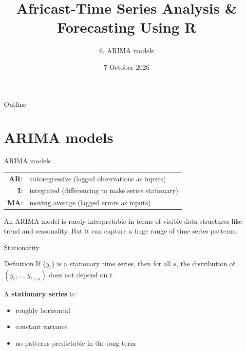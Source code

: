 \documentclass[
  14pt,
  ignorenonframetext,
  aspectratio=169,
]{beamer}
\title{\texorpdfstring{Africast-Time Series Analysis \& Forecasting
Using R}{Africast-Time Series Analysis \& Forecasting Using R}}
\subtitle{\texorpdfstring{6. ARIMA models}{6. ARIMA models}}
\author{}
\date{7 October 2026}
\providecommand{\tightlist}{%
  \setlength{\itemsep}{0pt}\setlength{\parskip}{0pt}}
\begin{document}
\frame{\titlepage}


\begin{frame}{Outline}
\protect{}\label{outline}
\vspace*{0.7cm}\tableofcontents
\end{frame}

\section{ARIMA models}\label{arima-models}

\begin{frame}{ARIMA models}
\protect{}\label{arima-models-1}
\begin{tabular}{rl}
\textbf{AR}: & autoregressive (lagged observations as inputs)\\
\textbf{I}: & integrated (differencing to make series stationary)\\
\textbf{MA}: & moving average (lagged errors as inputs)
\end{tabular}

\pause

\begin{block}{}
\protect{}\label{section}
An ARIMA model is rarely interpretable in terms of visible data
structures like trend and seasonality. But it can capture a huge range
of time series patterns.
\end{block}
\end{frame}

\begin{frame}{Stationarity}
\protect{}\label{stationarity}
\begin{block}{Definition}
If $\{y_t\}$ is a stationary time series, then for all $s$, the distribution of $(y_t,\dots,y_{t+s})$ does not depend on $t$.
\end{block}\pause

A \textbf{stationary series} is:

\begin{itemize}
\tightlist
\item
  roughly horizontal
\item
  constant variance
\item
  no patterns predictable in the long-term
\end{itemize}
\end{frame}
\end{document}
